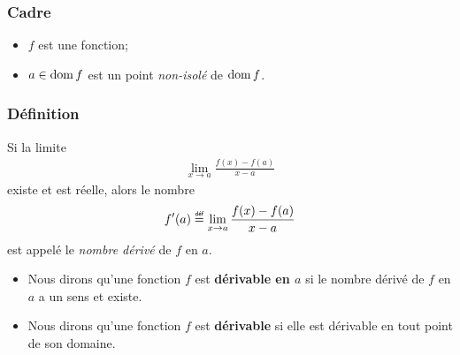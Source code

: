 \documentclass[main.tex]{subfiles}
\begin{document}
\begin{definition}

    \subsubsection*{Cadre}

    \begin{itemize}
        \item $f$ est une fonction;
        \item $a \in \operatorname{dom} f$ est un point \emph{non-isolé} de $\operatorname{dom} f$.
    \end{itemize}

    \subsubsection*{Définition}

    Si la limite
    \begin{align}
        \lim_{x \to a} \frac {f(x) - f(a)} {x - a}
    \end{align}
    existe et est réelle,
    alors le nombre
    \begin{align}
        f'(a) \defeq \lim_{x \to a} \frac {f(x) - f(a)} {x - a}
    \end{align}
    est appelé le \emph{nombre dérivé} de $f$ en $a$.
\end{definition}

\begin{remark}
    [Dérivabilité]

    \begin{itemize}
        \item Nous dirons qu'une fonction $f$ est \textbf{dérivable en $a$}
            si le nombre dérivé de $f$ en $a$ a un sens et existe.
        \item Nous dirons qu'une fonction $f$ est \textbf{dérivable}
            si elle est dérivable en tout point de son domaine.
    \end{itemize}
\end{remark}
\end{document}
